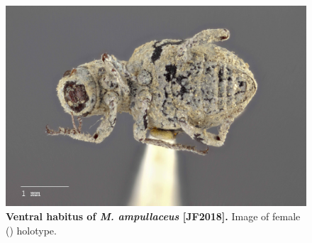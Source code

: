\documentclass[fleqn,10pt,lineno]{wlpeerj} %
\begin{document}
\begin{figure}[h]
	\begin{sideways}
		\centering
		\includegraphics[height=\textwidth]{ampullaceus_F_ventral.jpg}
	\end{sideways}
	\caption{\textbf{Ventral habitus of \textit{M. ampullaceus} [JF2018].} Image of female (\female) holotype.}
	\label{fig:ampullaceus_F_ventral}
\end{figure}
\end{document}
